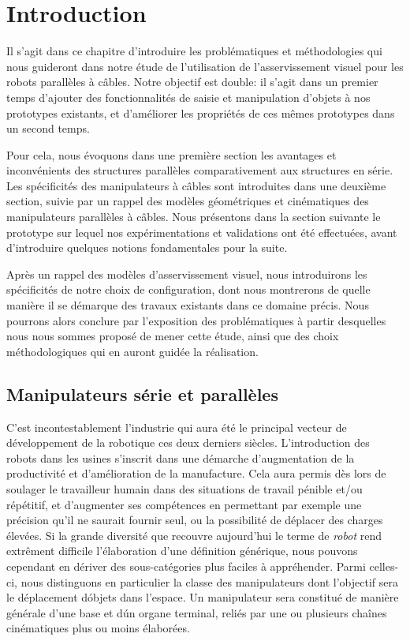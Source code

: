 \section{Introduction}

Il s'agit dans ce chapitre d'introduire les probl\'ematiques et m\'ethodologies qui nous guideront dans notre \'etude de l'utilisation de l'asservissement visuel pour les robots parall\`eles \`a c\^ables. Notre objectif est double: il s'agit dans un premier temps d'ajouter des fonctionnalit\'es de saisie et manipulation d'objets \`a nos prototypes existants, et d'am\'eliorer les propri\'et\'es de ces m\^emes prototypes dans un second temps.

Pour cela, nous  \'evoquons dans une premi\`ere section les avantages et inconv\'enients des structures parall\`eles comparativement aux structures en s\'erie. Les sp\'ecificit\'es des manipulateurs \`a c\^ables sont introduites dans une deuxi\`eme section, suivie par un rappel des mod\`eles g\'eom\'etriques et cin\'ematiques des manipulateurs parall\`eles \`a c\^ables. Nous pr\'esentons dans la section suivante le prototype sur lequel nos exp\'erimentations et validations ont \'et\'e effectu\'ees, avant d'introduire quelques notions fondamentales pour la suite.

Apr\`es un rappel des mod\`eles d'asservissement visuel, nous introduirons les sp\'ecificit\'es de notre choix de configuration, dont nous montrerons de quelle mani\`ere il se d\'emarque des travaux existants dans ce domaine pr\'ecis. Nous pourrons alors conclure par l'exposition des probl\'ematiques \`a partir desquelles nous nous sommes propos\'e de mener cette \'etude, ainsi que des choix m\'ethodologiques qui en auront guid\'ee la r\'ealisation.

\subsection{Manipulateurs s\'erie et parall\`eles}

C'est incontestablement l'industrie qui aura \'et\'e le principal vecteur de d\'eveloppement de la robotique ces deux derniers si\`ecles. L'introduction des robots dans les usines s'inscrit dans une d\'emarche d'augmentation de la productivit\'e et d'am\'elioration de la manufacture. Cela aura permis d\`es lors de soulager le travailleur humain dans des situations de travail p\'enible et/ou r\'ep\'etitif, et d'augmenter ses comp\'etences en permettant par exemple une pr\'ecision qu'il ne saurait fournir seul, ou la possibilit\'e de d\'eplacer des charges \'elev\'ees. Si la grande diversit\'e que recouvre aujourd'hui le terme de {\it robot} rend extr\^ement difficile l'\'elaboration d'une d\'efinition g\'en\'erique, nous pouvons cependant en d\'eriver des sous-cat\'egories plus faciles \`a appr\'ehender. Parmi celles-ci, nous distinguons en particulier la classe des manipulateurs dont l'objectif sera le d\'eplacement d\'objets dans l'espace. Un manipulateur sera constitu\'e de mani\`ere g\'en\'erale d'une base et d\'un organe terminal, reli\'es par une ou plusieurs cha\^ines cin\'ematiques plus ou moins \'elabor\'ees.


